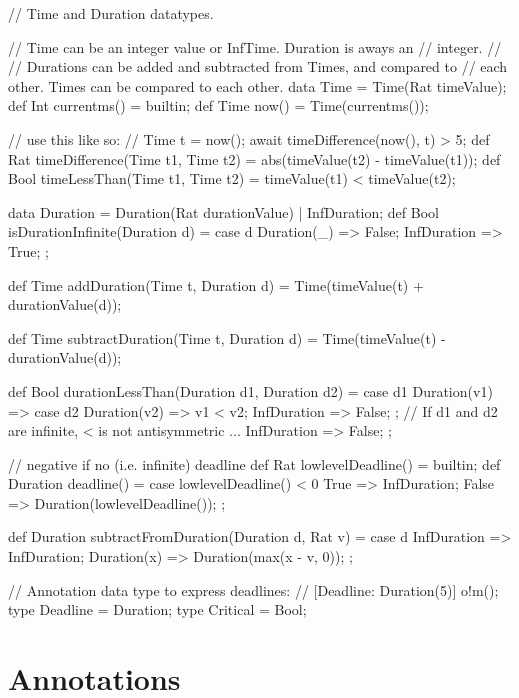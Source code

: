 \begin{abscode}
// Time and Duration datatypes.

// Time can be an integer value or InfTime.  Duration is aways an
// integer.
// 
// Durations can be added and subtracted from Times, and compared to
// each other.  Times can be compared to each other.
data Time = Time(Rat timeValue);
def Int currentms() = builtin;
def Time now() = Time(currentms());

// use this like so:
//   Time t = now(); await timeDifference(now(), t) > 5;
def Rat timeDifference(Time t1, Time t2) =
  abs(timeValue(t2) - timeValue(t1));
def Bool timeLessThan(Time t1, Time t2) =
  timeValue(t1) < timeValue(t2);

data Duration = Duration(Rat durationValue) | InfDuration;
def Bool isDurationInfinite(Duration d) = 
  case d { Duration(\_) => False; InfDuration => True; };

def Time addDuration(Time t, Duration d) =
  Time(timeValue(t) + durationValue(d));

def Time subtractDuration(Time t, Duration d) =
  Time(timeValue(t) - durationValue(d));

def Bool durationLessThan(Duration d1, Duration d2) =
  case d1 {
      Duration(v1) => case d2 {
          Duration(v2) => v1 < v2; 
          InfDuration => False; };
      // If d1 and d2 are infinite, < is not antisymmetric ...
      InfDuration => False;
  };

// negative if no (i.e. infinite) deadline
def Rat lowlevelDeadline() = builtin;
def Duration deadline() = 
  case lowlevelDeadline() < 0 {
      True => InfDuration;
      False => Duration(lowlevelDeadline());
  };

def Duration subtractFromDuration(Duration d, Rat v) =
  case d {
      InfDuration => InfDuration;
      Duration(x) => Duration(max(x - v, 0));
  };

// Annotation data type to express deadlines:
// [Deadline: Duration(5)] o!m();
type Deadline = Duration;
type Critical = Bool;

\end{abscode}

\section{Annotations}

